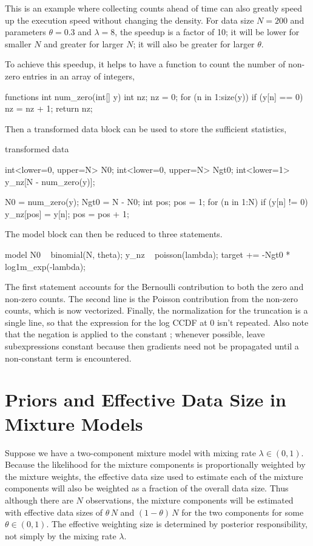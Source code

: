 This is an example where collecting counts ahead of time can also
greatly speed up the execution speed without changing the density.
For data size $N=200$ and parameters $\theta=0.3$ and $\lambda = 8$,
the speedup is a factor of 10; it will be lower for smaller $N$ and
greater for larger $N$; it will also be greater for larger $\theta$.

To achieve this speedup, it helps to have a function to count the
number of non-zero entries in an array of integers,
%
\begin{stancode}
functions {
  int num_zero(int[] y) {
    int nz;
    nz = 0;
    for (n in 1:size(y))
      if (y[n] == 0)
        nz = nz + 1;
    return nz;
  }
}
\end{stancode}
%
Then a transformed data block can be used to store the sufficient
statistics,
%
\begin{stancode}
transformed data {
  int<lower=0, upper=N> N0;
  int<lower=0, upper=N> Ngt0;
  int<lower=1> y_nz[N - num_zero(y)];

  N0 = num_zero(y);
  Ngt0 = N - N0;
  { 
    int pos;
    pos = 1;
    for (n in 1:N) {
      if (y[n] != 0) {
        y_nz[pos] = y[n];
        pos = pos + 1;
      }
    }
  }
}
\end{stancode}
%
The model block can then be reduced to three statements.
%
\begin{stancode}
model {
  N0 ~ binomial(N, theta);
  y_nz ~ poisson(lambda);
  target += -Ngt0 * log1m_exp(-lambda);
}
\end{stancode}
%
The first statement accounts for the Bernoulli contribution to both
the zero and non-zero counts.  The second line is the Poisson
contribution from the non-zero counts, which is now vectorized.
Finally, the normalization for the truncation is a single line, so
that the expression for the log CCDF at 0 isn't repeated.  Also note
that the negation is applied to the constant ; whenever
possible, leave subexpressions constant because then gradients need
not be propagated until a non-constant term is encountered.


\section{Priors and Effective Data Size in Mixture Models}

Suppose we have a two-component mixture model with mixing rate
$\lambda \in (0, 1)$.  Because the likelihood for the mixture
components is proportionally weighted by the mixture weights, the
effective data size used to estimate each of the mixture components
will also be weighted as a fraction of the overall data size.  Thus
although there are $N$ observations, the mixture components will be
estimated with effective data sizes of $\theta \, N$ and $(1 - \theta)
\, N$ for the two components for some $\theta \in (0, 1)$.  The
effective weighting size is determined by posterior responsibility,
not simply by the mixing rate $\lambda$.

